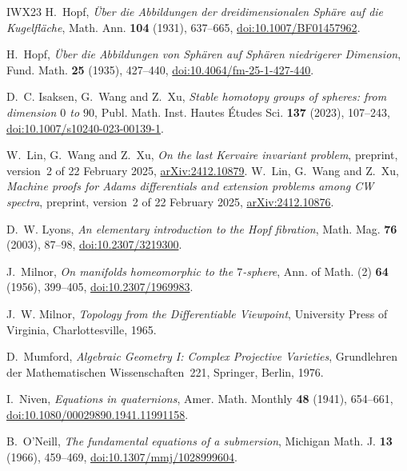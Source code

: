 \begin{thebibliography}{IWX23}
 H.~Hopf, \emph{\"Uber die Abbildungen der dreidimensionalen Sph\"are auf die Kugelfl\"ache}, Math. Ann. \textbf{104} (1931), 637--665, \href{https://doi.org/10.1007/BF01457962}{doi:10.1007/BF01457962}.

 H.~Hopf, \emph{\"Uber die Abbildungen von Sph\"aren auf Sph\"aren niedrigerer Dimension}, Fund. Math. \textbf{25} (1935), 427--440, \href{https://doi.org/10.4064/fm-25-1-427-440}{doi:10.4064/fm-25-1-427-440}.

 D.~C. Isaksen, G.~Wang and Z.~Xu, \emph{Stable homotopy groups of spheres: from dimension $0$ to $90$}, Publ. Math. Inst. Hautes \'Etudes Sci. \textbf{137} (2023), 107--243, \href{https://doi.org/10.1007/s10240-023-00139-1}{doi:10.1007/s10240-023-00139-1}.

 W.~Lin, G.~Wang and Z.~Xu, \emph{On the last Kervaire invariant problem}, preprint, version~2 of 22 February 2025, \href{https://arxiv.org/abs/2412.10879}{arXiv:2412.10879}.
 W.~Lin, G.~Wang and Z.~Xu, \emph{Machine proofs for Adams differentials and extension problems among CW spectra}, preprint, version~2 of 22 February 2025, \href{https://arxiv.org/abs/2412.10876}{arXiv:2412.10876}.

 D.~W. Lyons, \emph{An elementary introduction to the Hopf fibration}, Math. Mag. \textbf{76} (2003), 87--98, \href{https://doi.org/10.2307/3219300}{doi:10.2307/3219300}.

 J.~Milnor, \emph{On manifolds homeomorphic to the $7$-sphere}, Ann. of Math. (2) \textbf{64} (1956), 399--405, \href{https://doi.org/10.2307/1969983}{doi:10.2307/1969983}.

 J.~W. Milnor, \emph{Topology from the Differentiable Viewpoint}, University Press of Virginia, Charlottesville, 1965.

 D.~Mumford, \emph{Algebraic Geometry I: Complex Projective Varieties}, Grundlehren der Mathematischen Wissenschaften~221, Springer, Berlin, 1976.

 I.~Niven, \emph{Equations in quaternions}, Amer. Math. Monthly \textbf{48} (1941), 654--661, \href{https://doi.org/10.1080/00029890.1941.11991158}{doi:10.1080/00029890.1941.11991158}.

 B.~O'Neill, \emph{The fundamental equations of a submersion}, Michigan Math. J. \textbf{13} (1966), 459--469, \href{https://doi.org/10.1307/mmj/1028999604}{doi:10.1307/mmj/1028999604}.


\end{thebibliography}
